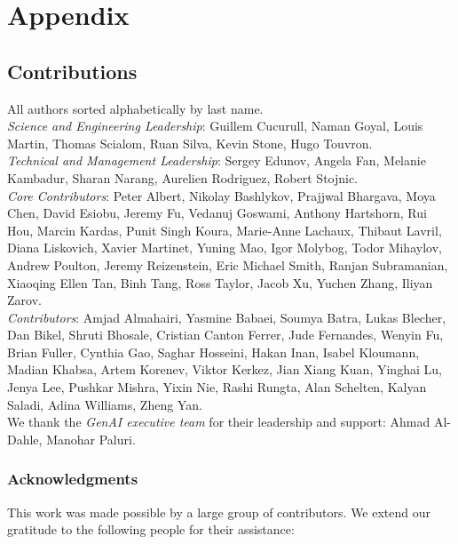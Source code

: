 \documentclass{article}
\begin{document}
  


\appendix
\section{Appendix}

\subsection{Contributions}
\label{app:contributinos}
All authors sorted alphabetically by last name. \\ 

\textit{Science and Engineering Leadership}: Guillem Cucurull, Naman Goyal, Louis Martin, Thomas Scialom, Ruan Silva, Kevin Stone, Hugo Touvron. \\

\textit{Technical and Management Leadership}: Sergey Edunov, Angela Fan, Melanie Kambadur, Sharan Narang, Aurelien Rodriguez, Robert Stojnic. \\

\textit{Core Contributors}: Peter Albert, Nikolay Bashlykov, Prajjwal Bhargava, Moya Chen, David Esiobu, Jeremy Fu, Vedanuj Goswami, Anthony Hartshorn, Rui Hou, Marcin Kardas, Punit Singh Koura, Marie-Anne Lachaux, Thibaut Lavril, Diana Liskovich, Xavier Martinet, Yuning Mao, Igor Molybog, Todor Mihaylov, Andrew Poulton, Jeremy Reizenstein, Eric Michael Smith, Ranjan Subramanian, Xiaoqing Ellen Tan, Binh Tang, Ross Taylor, Jacob Xu, Yuchen Zhang, Iliyan Zarov. \\

\textit{Contributors}: Amjad Almahairi, Yasmine Babaei, Soumya Batra, Lukas Blecher, Dan Bikel, Shruti Bhosale, Cristian Canton Ferrer, Jude Fernandes, Wenyin Fu, Brian Fuller, Cynthia Gao, Saghar Hosseini, Hakan Inan, Isabel Kloumann, Madian Khabsa, Artem Korenev, Viktor Kerkez, Jian Xiang Kuan, Yinghai Lu, Jenya Lee, Pushkar Mishra, Yixin Nie, Rashi Rungta, Alan Schelten, Kalyan Saladi, Adina Williams, Zheng Yan.\\

We thank the \textit{GenAI executive team} for their leadership and support: Ahmad Al-Dahle, Manohar Paluri. \\

\subsubsection{Acknowledgments}
This work was made possible by a large group of contributors. We extend our gratitude to the following people for their assistance:
\end{document}

